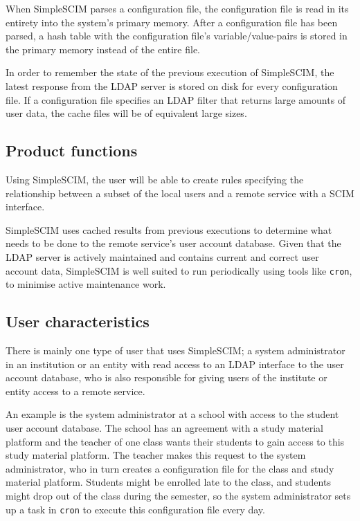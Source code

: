 \documentclass[12pt,twoside,a4paper,titlepage]{article}
\begin{document}
   When SimpleSCIM parses a configuration file, the configuration
   file is read in its entirety into the system's primary memory.
   After a configuration file has been parsed, a hash table with the
   configuration file's variable/value-pairs is stored in the primary
   memory instead of the entire file.

   In order to remember the state of the previous execution of
   SimpleSCIM, the latest response from the LDAP server is stored on
   disk for every configuration file. If a configuration file
   specifies an LDAP filter that returns large amounts of user data,
   the cache files will be of equivalent large sizes.

  \subsection{Product functions}

  Using SimpleSCIM, the user will be able to create rules specifying
  the relationship between a subset of the local users and a remote
  service with a SCIM interface.

  SimpleSCIM uses cached results from previous executions to
  determine what needs to be done to the remote service's user
  account database. Given that the LDAP server is actively maintained
  and contains current and correct user account data, SimpleSCIM is
  well suited to run periodically using tools like \texttt{cron},
  to minimise active maintenance work.

  \subsection{User characteristics}

  There is mainly one type of user that uses SimpleSCIM; a system
  administrator in an institution or an entity with read access to
  an LDAP interface to the user account database, who is also
  responsible for giving users of the institute or entity access to
  a remote service.

  An example is the system administrator at a school with access to
  the student user account database. The school has an agreement with
  a study material platform and the teacher of one class wants their
  students to gain access to this study material platform. The
  teacher makes this request to the system administrator, who in turn
  creates a configuration file for the class and study material
  platform. Students might be enrolled late to the class, and
  students might drop out of the class during the semester, so the
  system administrator sets up a task in \texttt{cron} to execute
  this configuration file every day.
\end{document}
